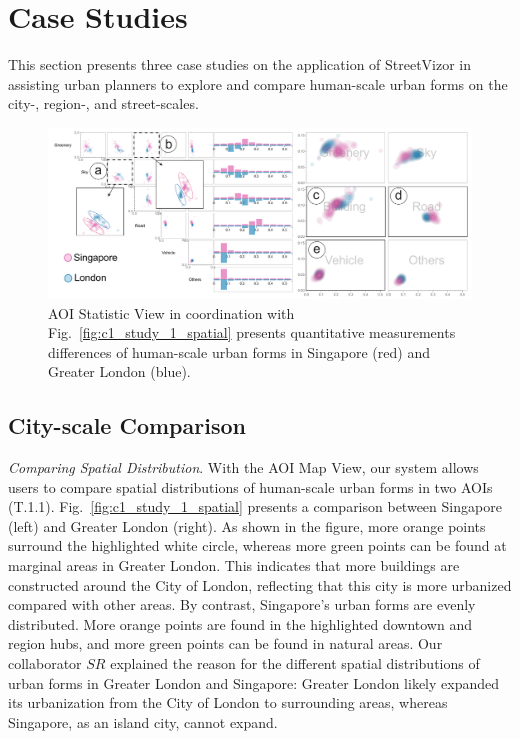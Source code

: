 \section{Case Studies}

This section presents three case studies on the application of StreetVizor in assisting urban planners to explore and compare human-scale urban forms on the city-, region-, and street-scales.

\begin{figure}[t]
	\centering
	\includegraphics[width=\columnwidth]{figure/streetvizor/fig8_study_1/study_1_statistic}
	\vspace{-7mm}
	\caption{AOI Statistic View in coordination with Fig.~\ref{fig:c1_study_1_spatial} presents quantitative measurements differences of human-scale urban forms in Singapore (red) and Greater London (blue).}
	\label{fig:c1_study_1_statistic}
	\vspace{-1mm}
\end{figure}



\subsection{City-scale Comparison}

\textit{Comparing Spatial Distribution}.
With the AOI Map View, our system allows users to compare spatial distributions of human-scale urban forms in two AOIs (T.1.1).
Fig.~\ref{fig:c1_study_1_spatial} presents a comparison between Singapore (left) and Greater London (right).
As shown in the figure, more orange points surround the highlighted white circle, whereas more green points can be found at marginal areas in Greater London.
This indicates that more buildings are constructed around the City of London, reflecting that this city is more urbanized compared with other areas.
By contrast, Singapore's urban forms are evenly distributed.
More orange points are found in the highlighted downtown and region hubs, and more green points can be found in natural areas.
Our collaborator $SR$ explained the reason for the different spatial distributions of urban forms in Greater London and Singapore: Greater London likely expanded its urbanization from the City of London to surrounding areas, whereas Singapore, as an island city, cannot expand.

